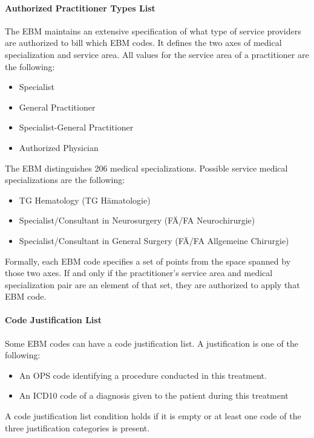 \paragraph{Authorized Practitioner Types List}\label{par:authorized-practitioner-types-list}
The EBM maintains an extensive specification of what type of service providers are authorized to bill which EBM codes.
It defines the two axes of medical specialization and service area.
All values for the service area of a practitioner are the following:
\begin{itemize}
    \item Specialist
    \item General Practitioner
    \item Specialist-General Practitioner
    \item Authorized Physician
\end{itemize}
The EBM distinguishes 206 medical specializations.
Possible service medical specializations are the following:
\begin{itemize}
    \item TG Hematology (TG Hämatologie)
    \item Specialist/Consultant in Neurosurgery (FÄ/FA Neurochirurgie)
    \item Specialist/Consultant in General Surgery (FÄ/FA Allgemeine Chirurgie)
\end{itemize}
Formally, each EBM code specifies a set of points from the space spanned by those two axes.
If and only if the practitioner's service area and medical specialization pair are an element of that set, they are authorized to apply that EBM code.


\paragraph{Code Justification List}
Some EBM codes can have a code justification list.
A justification is one of the following:
\begin{itemize}
    \item An OPS code identifying a procedure conducted in this treatment.
    \item An ICD10 code of a diagnosis given to the patient during this treatment
\end{itemize}
A code justification list condition holds if it is empty or at least one code of the three justification categories is present.

